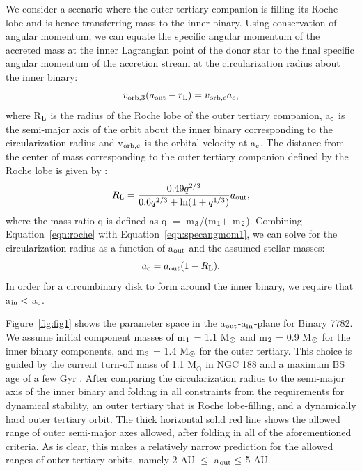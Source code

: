 \documentclass[useAMS,usenatbib]{mnras}
\begin{document}
We consider a scenario where the outer tertiary companion is filling its Roche lobe and is hence transferring mass to the inner binary.  Using conservation of angular momentum, we can equate the specific angular momentum of the accreted mass at the inner Lagrangian point of the donor star to the final specific angular momentum of the accretion stream at the circularization radius about the inner binary:
\begin{equation}
\label{eqn:specangmom1}
v_{\rm orb,3}(a_{\rm out} - r_{\rm L}) = v_{\rm orb,c}a_{\rm c},
\end{equation}
where R$_{\rm L}$ is the radius of the Roche lobe of the outer tertiary companion, a$_{\rm c}$ is the semi-major axis of the orbit about the inner binary corresponding to the circularization radius and v$_{\rm orb,c}$ is the orbital velocity at a$_{\rm c}$.  The distance from the center of mass corresponding to the outer tertiary companion defined by the Roche lobe is given by \citep{eggleton83}: 
\begin{equation}
\label{eqn:roche}
R_{\rm L} = \frac{0.49q^{2/3}}{0.6q^{2/3} + {\rm ln}(1 + q^{1/3})}a_{\rm out},
\end{equation}
where the mass ratio q is defined as q $=$ m$_{\rm 3}$/(m$_{\rm 1} +$ m$_{\rm 2}$).  Combining Equation~\ref{eqn:roche} with Equation~\ref{eqn:specangmom1}, we can solve for the circularization radius as a function of a$_{\rm out}$ and the assumed stellar masses:
\begin{equation}
\label{eqn:ac}
a_{\rm c} = a_{\rm out}(1 - R_{\rm L}).
\end{equation}
In order for a circumbinary disk to form around the inner binary, we require that a$_{\rm in} <$ a$_{\rm c}$.

Figure~\ref{fig:fig1} shows the parameter space in the a$_{\rm out}$-a$_{\rm in}$-plane for Binary 7782.  We assume initial component masses of m$_{\rm 1}$ = 1.1 M$_{\rm \odot}$ and m$_{\rm 2}$ = 0.9 M$_{\rm \odot}$ for the inner binary components, and m$_{\rm 3}$ = 1.4 M$_{\rm \odot}$ for the outer tertiary.  This choice is guided by the current turn-off mass of 1.1 M$_{\odot}$ in NGC 188 \citep{mathieu09} and a maximum BS age of a few Gyr \citep[e.g.][]{sills99,sills01}.  After comparing the circularization radius to the semi-major axis of the inner binary and folding in all constraints from the requirements for dynamical stability, an outer tertiary that is Roche lobe-filling, and a dynamically hard outer tertiary orbit.  The thick horizontal solid red line shows the allowed range of outer semi-major axes allowed, after folding in all of the aforementioned criteria.  As is clear, this makes a relatively narrow prediction for the allowed ranges of outer tertiary orbits, namely 2 AU $\le$ a$_{\rm out} \le$ 5 AU.  
\end{document}
